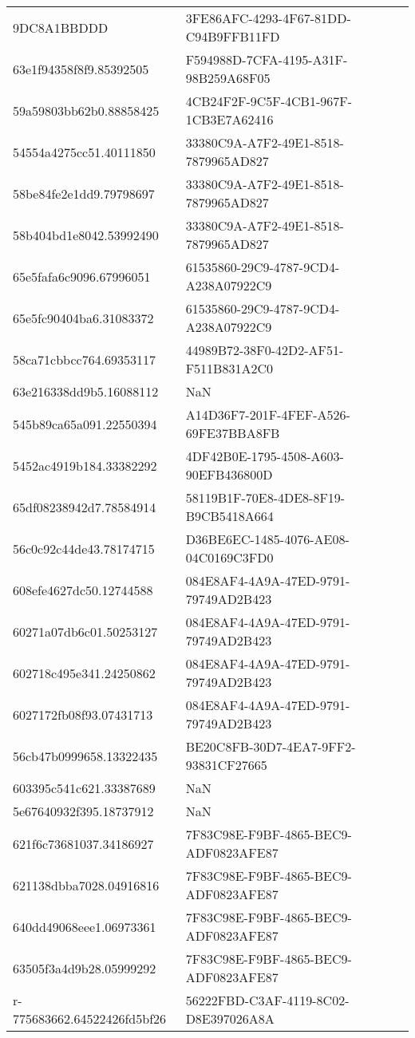 \begin{tabular}{ll}
9DC8A1BBDDD & 3FE86AFC-4293-4F67-81DD-C94B9FFB11FD \\
63e1f94358f8f9.85392505 & F594988D-7CFA-4195-A31F-98B259A68F05 \\
59a59803bb62b0.88858425 & 4CB24F2F-9C5F-4CB1-967F-1CB3E7A62416 \\
54554a4275cc51.40111850 & 33380C9A-A7F2-49E1-8518-7879965AD827 \\
58be84fe2e1dd9.79798697 & 33380C9A-A7F2-49E1-8518-7879965AD827 \\
58b404bd1e8042.53992490 & 33380C9A-A7F2-49E1-8518-7879965AD827 \\
65e5fafa6c9096.67996051 & 61535860-29C9-4787-9CD4-A238A07922C9 \\
65e5fc90404ba6.31083372 & 61535860-29C9-4787-9CD4-A238A07922C9 \\
58ca71cbbcc764.69353117 & 44989B72-38F0-42D2-AF51-F511B831A2C0 \\
63e216338dd9b5.16088112 & NaN \\
545b89ca65a091.22550394 & A14D36F7-201F-4FEF-A526-69FE37BBA8FB \\
5452ac4919b184.33382292 & 4DF42B0E-1795-4508-A603-90EFB436800D \\
65df08238942d7.78584914 & 58119B1F-70E8-4DE8-8F19-B9CB5418A664 \\
56c0c92c44de43.78174715 & D36BE6EC-1485-4076-AE08-04C0169C3FD0 \\
608efe4627dc50.12744588 & 084E8AF4-4A9A-47ED-9791-79749AD2B423 \\
60271a07db6c01.50253127 & 084E8AF4-4A9A-47ED-9791-79749AD2B423 \\
602718c495e341.24250862 & 084E8AF4-4A9A-47ED-9791-79749AD2B423 \\
6027172fb08f93.07431713 & 084E8AF4-4A9A-47ED-9791-79749AD2B423 \\
56cb47b0999658.13322435 & BE20C8FB-30D7-4EA7-9FF2-93831CF27665 \\
603395c541c621.33387689 & NaN \\
5e67640932f395.18737912 & NaN \\
621f6c73681037.34186927 & 7F83C98E-F9BF-4865-BEC9-ADF0823AFE87 \\
621138dbba7028.04916816 & 7F83C98E-F9BF-4865-BEC9-ADF0823AFE87 \\
640dd49068eee1.06973361 & 7F83C98E-F9BF-4865-BEC9-ADF0823AFE87 \\
63505f3a4d9b28.05999292 & 7F83C98E-F9BF-4865-BEC9-ADF0823AFE87 \\
r-775683662.64522426fd5bf26 & 56222FBD-C3AF-4119-8C02-D8E397026A8A \\

\end{tabular}
